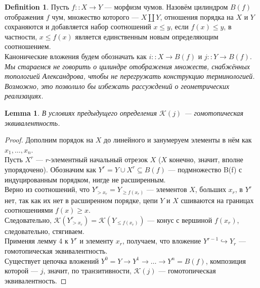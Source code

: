 \documentclass[a4paper, 12pt]{article}
\newtheorem{lemma}{Lemma}
\theoremstyle{definition}
\newtheorem{definition}{Definition}
\theoremstyle{remark}
\begin{document}
\begin{definition}
  Пусть $f :: X \to Y$ --- морфизм чумов. Назовём цилиндром $B(f)$ отображения $f$ чум, множество которого --- $X \coprod Y$, отношения порядка на $X$ и $Y$ сохраняются и добавляется набор соотношений $x \leqslant y$, если $f(x) \leqslant y$, в частности, $x \leqslant f(x)$ является единственным новым определяющим соотношением.\\
  Канонические вложения будем обозначать как $i :: X \to B(f)$ и $j :: Y \to B(f)$.
  \textit{Мы стараемся не говорить о цилиндре отображения множеств, снабжённых топологией Александрова, чтобы не перегружать конструкцию терминологией. Возможно, это позволило бы избежать рассуждений о геометрических реализациях.}
\end{definition}

\begin{lemma}
  В условиях предыдущего определения $\mathcal{K}(j)$ --- гомотопическая эквивалентность.
\end{lemma}
\begin{proof}
  Дополним порядок на $X$ до линейного и занумеруем элементы в нём как $x_1,\ldots,x_n$.\\
  Пусть $X^r$ --- $r$-элементный начальный отрезок $X$ ($X$ конечно, значит, вполне упорядочено). Обозначим как $Y^r = Y \cup X^r \subseteq B(f)$ --- подмножество B(f) с индуцированным порядком, нигде не расширенным.\\
  Верно из соотношений, что $Y^r_{>x_r} = Y_{\geqslant f(x_r)}$ --- элементов $X$, больших $x_r$, в $Y^r$ нет, так как их нет в расширенном порядке, цепи $Y$ и $X$ сшиваются на границах соотношениями $f(x) \geqslant x$.\\
  Следовательно, $\mathcal{K}(Y^r_{>x_r}) = \mathcal{K}(Y_{\leqslant f(x_r)})$ --- конус с вершиной $f(x_r)$, следовательно, стягиваем.\\

  Применяя лемму 4 к $Y^r$ и элементу $x_r$, получаем, что вложение $Y^{r-1} \hookrightarrow Y_r$ --- гомотопическая эквивалентность.\\
  Существует цепочка вложений $Y^0 = Y \to Y^1 \to \ldots \to Y^n = B(f)$, композиция которой --- $j$, значит, по транзитивности, $\mathcal{K}(j)$ --- гомотопическая эквивалентность.
\end{proof}
\end{document}
